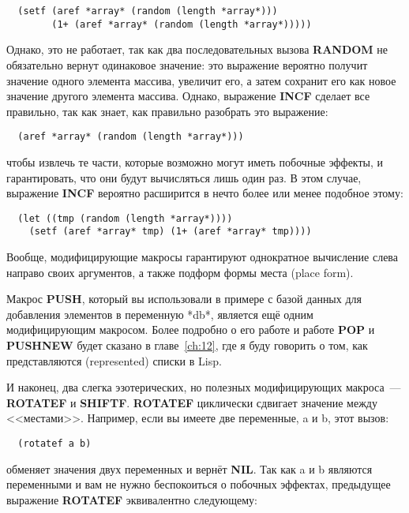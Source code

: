 \begin{lstlisting}
  (setf (aref *array* (random (length *array*)))
        (1+ (aref *array* (random (length *array*)))))
\end{lstlisting}

Однако, это не работает, так как два последовательных вызова \textbf{RANDOM} не
обязательно вернут одинаковое значение: это выражение вероятно получит значение одного
элемента массива, увеличит его, а затем сохранит его как новое значение другого элемента
массива. Однако, выражение \textbf{INCF} сделает все правильно, так как знает, как
правильно разобрать это выражение:

\begin{lstlisting}
  (aref *array* (random (length *array*)))
\end{lstlisting}

чтобы извлечь те части, которые возможно могут иметь побочные эффекты, и гарантировать,
что они будут вычисляться лишь один раз. В этом случае, выражение \textbf{INCF} вероятно
расширится в нечто более или менее подобное этому:

\begin{lstlisting}
  (let ((tmp (random (length *array*))))
    (setf (aref *array* tmp) (1+ (aref *array* tmp))))
\end{lstlisting}

Вообще, модифицирующие макросы гарантируют однократное вычисление слева направо своих
аргументов, а также подформ формы места (place form).

Макрос \textbf{PUSH}, который вы использовали в примере с базой данных для добавления
элементов в переменную *db*, является ещё одним модифицирующим макросом. Более подробно о
его работе и работе \textbf{POP} и \textbf{PUSHNEW} будет сказано в главе~\ref{ch:12}, где
я буду говорить о том, как представляются (represented) списки в Lisp.

И наконец, два слегка эзотерических, но полезных модифицирующих макроса~---
\textbf{ROTATEF} и \textbf{SHIFTF}. \textbf{ROTATEF} циклически сдвигает значение между
<<местами>>. Например, если вы имеете две переменные, a и b, этот вызов:

\begin{lstlisting}
  (rotatef a b)
\end{lstlisting}

обменяет значения двух переменных и вернёт \textbf{NIL}. Так как a и b являются
переменными и вам не нужно беспокоиться о побочных эффектах, предыдущее выражение
\textbf{ROTATEF} эквивалентно следующему:


